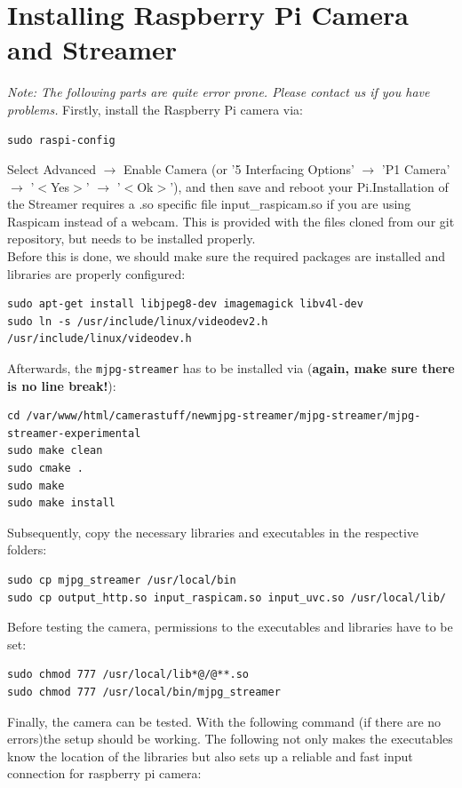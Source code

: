 \section{Installing Raspberry Pi Camera and Streamer}
\textit{Note: The following parts are quite error prone. Please contact us if you have problems.}
Firstly, install the Raspberry Pi camera via:
\begin{lstlisting}
sudo raspi-config
\end{lstlisting}
Select Advanced $\rightarrow$ Enable Camera (or '5 Interfacing Options' $\rightarrow$ 'P1 Camera' $\rightarrow$ '$<$Yes$>$' $\rightarrow$ '$<$Ok$>$'), and then save and reboot your Pi.Installation of the Streamer requires a .so specific file input\_raspicam.so if you are using Raspicam instead of a webcam. This is provided with the files cloned from our git repository, but needs to be installed properly.\\
Before this is done, we should make sure the required packages are installed and libraries are properly configured:
\begin{lstlisting}
sudo apt-get install libjpeg8-dev imagemagick libv4l-dev
sudo ln -s /usr/include/linux/videodev2.h /usr/include/linux/videodev.h
\end{lstlisting}
Afterwards, the \texttt{mjpg-streamer} has to be installed via (\textbf{again, make sure there is no line break!}):
\begin{lstlisting}
cd /var/www/html/camerastuff/newmjpg-streamer/mjpg-streamer/mjpg-streamer-experimental
sudo make clean
sudo cmake .
sudo make
sudo make install
\end{lstlisting}
Subsequently, copy the necessary libraries and executables in the respective folders:
\begin{lstlisting}
sudo cp mjpg_streamer /usr/local/bin
sudo cp output_http.so input_raspicam.so input_uvc.so /usr/local/lib/
\end{lstlisting}
Before testing the camera,  permissions to the executables and libraries have to be set:
\begin{lstlisting}
sudo chmod 777 /usr/local/lib*@/@**.so
sudo chmod 777 /usr/local/bin/mjpg_streamer
\end{lstlisting}
Finally, the camera can be tested. With the following command (if there are no errors)the setup should be working. The following not only makes the executables know the location of the libraries but also sets up a reliable and fast input connection for raspberry pi camera:
